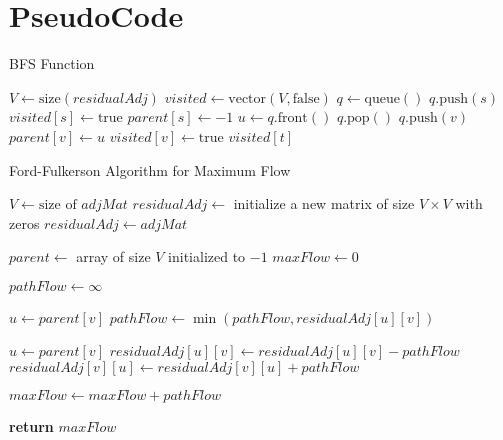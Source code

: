 \documentclass{article}
\begin{document}
\section{PseudoCode}
\begin{algorithm}[H]
\caption{BFS Function}
\begin{algorithmic}
        \State $V \gets \text{size}(residualAdj)$
        \State $visited \gets \text{vector}(V, \text{false})$
        \State $q \gets \text{queue}()$
        \State $q.\text{push}(s)$
        \State $visited[s] \gets \text{true}$
        \State $parent[s] \gets -1$
            \State $u \gets q.\text{front}()$
            \State $q.\text{pop}()$
                    \State $q.\text{push}(v)$
                    \State $parent[v] \gets u$
                    \State $visited[v] \gets \text{true}$
                \EndIf
            \EndFor
        \EndWhile
        \State \Return $visited[t]$
    \EndFunction
\end{algorithmic}
\end{algorithm}
\begin{algorithm}
\caption{Ford-Fulkerson Algorithm for Maximum Flow}
\begin{algorithmic}[1]
    \State $V \gets \text{size of } adjMat$
    \State $residualAdj \gets$ initialize a new matrix of size $V \times V$ with zeros 
    \State $residualAdj \gets adjMat$ 

    \State $parent \gets$ array of size $V$ initialized to $-1$ 
    \State $maxFlow \gets 0$

        \State $pathFlow \gets \infty$ 

            \State $u \gets parent[v]$
            \State $pathFlow \gets \min(pathFlow, residualAdj[u][v])$ 
        \EndFor

            \State $u \gets parent[v]$
            \State $residualAdj[u][v] \gets residualAdj[u][v] - pathFlow$ 
            \State $residualAdj[v][u] \gets residualAdj[v][u] + pathFlow$ 
        \EndFor

        \State $maxFlow \gets maxFlow + pathFlow$ 
    \EndWhile

    \State \textbf{return} $maxFlow$
\EndFunction
\end{algorithmic}
\end{algorithm}
\end{document}
